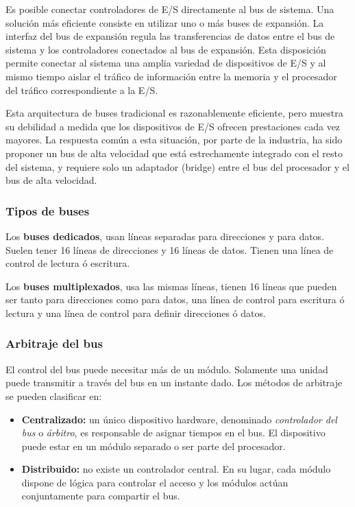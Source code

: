 Es posible conectar controladores de E/S directamente al bus de sistema. Una solución más eficiente consiste en utilizar uno o más buses de expansión. La interfaz del bus de expansión regula las transferencias de datos entre el bus de sistema y los controladores conectados al bus de expansión. Esta disposición permite conectar al sistema una amplia variedad de dispositivos de E/S y al mismo tiempo aislar el tráfico de información entre la memoria y el procesador del tráfico correspondiente a la E/S.

Esta arquitectura de buses tradicional es razonablemente eficiente, pero muestra su debilidad a medida que los dispositivos de E/S ofrecen prestaciones cada vez mayores. La respuesta común a esta situación, por parte de la industria, ha sido proponer un bus de alta velocidad que está estrechamente integrado con el resto del sistema, y requiere solo un adaptador (bridge) entre el bus del procesador y el bus de alta velocidad.

\subsubsection*{Tipos de buses}

Los \textbf{buses dedicados}, usan líneas separadas para direcciones y para datos. Suelen tener 16 líneas de direcciones y 16 líneas de datos. Tienen una línea de control de lectura ó escritura.

Los \textbf{buses multiplexados}, usa las mismas líneas, tienen 16 líneas que pueden ser tanto para direcciones como para datos, una línea de control para escritura ó lectura y una línea de control para definir direcciones ó datos.

\subsubsection*{Arbitraje del bus}

El control del bus puede necesitar más de un módulo. Solamente una unidad puede transmitir a través del bus en un instante dado. Los métodos de arbitraje se pueden clasificar en:

\begin{itemize}
  \item \textbf{Centralizado:} un único dispositivo hardware, denominado \textit{controlador del bus} o \textit{árbitro}, es responsable de asignar tiempos en el bus. El dispositivo puede estar en un módulo separado o ser parte del procesador.
  \item \textbf{Distribuido:} no existe un controlador central. En su lugar, cada módulo dispone de lógica para controlar el acceso y los módulos actúan conjuntamente para compartir el bus. 
\end{itemize}

